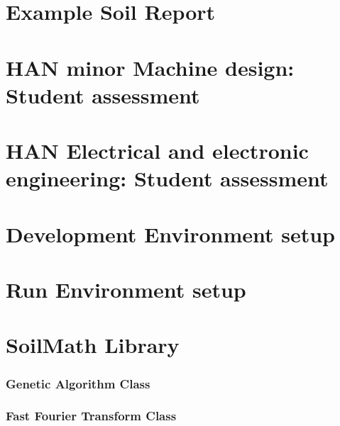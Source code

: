 \documentclass[11pt,fleqn,,a4paper,twoside,openright]{book}
\begin{document}
\chapter{Example Soil Report}


\chapter{HAN minor Machine design: Student assessment}\label{HAN_assignment_Machine}


\chapter{HAN Electrical and electronic engineering: Student assessment}\label{HAN_assignement_Electrical}


\chapter{Development Environment setup}\label{SDE}

\chapter{Run Environment setup}\label{RE}


\chapter{SoilMath Library}
\subsection*{Genetic Algorithm Class}


\newpage
\subsection*{Fast Fourier Transform Class}


\newpage
\end{document}
